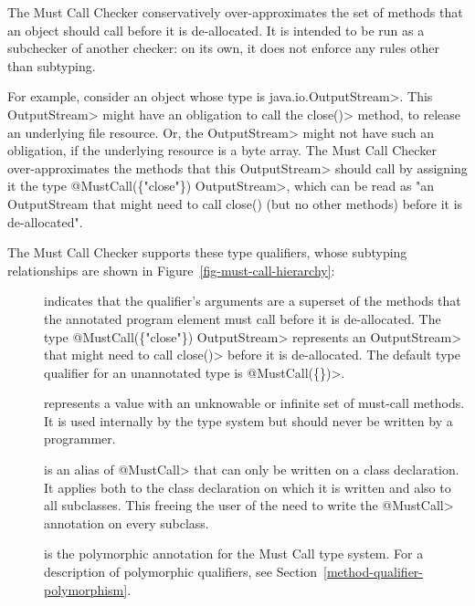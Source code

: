\htmlhr
{}

The Must Call Checker conservatively over-approximates
the set of methods that an object should call before it is de-allocated.
It is intended to be run as a subchecker of another checker: on its own, it does not
enforce any rules other than subtyping.

For example, consider an object whose type is \<java.io.OutputStream>.
This \<OutputStream> might have an obligation to call the \<close()> method, to release an
underlying file resource. Or, the \<OutputStream> might not have such an obligation, if the
underlying resource is a byte array. The Must Call Checker over-approximates the methods that this
\<OutputStream> should call by assigning it the type \<@MustCall(\{"close"\}) OutputStream>, which can be read
as "an OutputStream that might need to call close() (but no other methods) before it is de-allocated".


The Must Call Checker supports these type qualifiers, whose subtyping relationships
are shown in Figure~\ref{fig-must-call-hierarchy}:

\begin{description}

\item[]
  indicates that the qualifier's arguments are a superset of the methods that the annotated program element
  must call before it is de-allocated.
  The type \<@MustCall(\{"close"\}) OutputStream> represents an \<OutputStream> that might need
  to call \<close()> before it is de-allocated.
  The default type qualifier for an unannotated type is \<@MustCall(\{\})>.

\item[]
  represents a value with an unknowable or infinite set of must-call methods.
  It is used internally by the type system but should never be written by a
  programmer.

\item[]
  is an alias of \<@MustCall> that can only be written on a class declaration.
  It applies both to the class declaration on which it is written and also to all subclasses.
  This freeing the user of the need to write the \<@MustCall> annotation on every subclass.

\item[]
  is the polymorphic annotation for the Must Call type system.
  For a description of polymorphic qualifiers, see
  Section~\ref{method-qualifier-polymorphism}.

\end{description}

